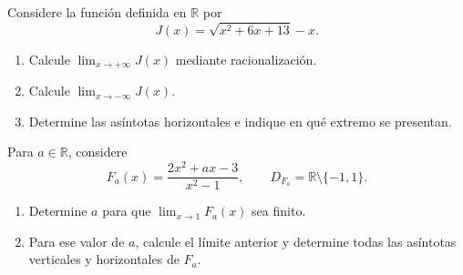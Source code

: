 \documentclass[10pt,a5paper]{article}
\newif\ifmostrarSoluciones
\newenvironment{solucionejercicio}[1]{%
  \par\medskip\noindent\textbf{Solución del ejercicio #1.}%
  \enspace\ignorespaces
}{%
  \par\medskip
}
\begin{document}
\begin{ejerciciopractica}
  Considere la función definida en $\mathbb{R}$ por
  \[
    J(x)=\sqrt{x^2+6x+13}-x.
  \]
  \begin{enumerate}
    \item Calcule $\lim_{x\to+\infty}J(x)$ mediante racionalización.
    \item Calcule $\lim_{x\to-\infty}J(x)$.
    \item Determine las asíntotas horizontales e indique en qué extremo se presentan.
  \end{enumerate}
\end{ejerciciopractica}

\ifmostrarSoluciones
\begin{solucionejercicio}{2}
  El radicando es $(x+3)^2+4>0$, así que la función está definida para todo número real.

  Cuando $x\to+\infty$, aparece una diferencia de términos que crecen sin cota. Para $x>0$, multiplicamos por el conjugado y obtenemos
  \begin{align*}
    J(x)&=\frac{6x+13}{\sqrt{x^2+6x+13}+x}\\
        &=\frac{6+13/x}{\sqrt{1+6/x+13/x^2}+1}.
  \end{align*}
  En el último paso usamos $\sqrt{x^2}=x$, válido porque $x>0$. Por tanto,
  \[
    \lim_{x\to+\infty}J(x)=\frac{6}{1+1}=3.
  \]

  Para $x<0$, la raíz es no negativa y $-x>0$, de modo que $J(x)\geq-x$. Como $-x\to+\infty$ cuando $x\to-\infty$, la comparación implica
  \[
    \lim_{x\to-\infty}J(x)=+\infty.
  \]
  La única asíntota horizontal es $y=3$, hacia $+\infty$. No hay asíntota horizontal hacia $-\infty$.
\end{solucionejercicio}
\fi

\begin{ejerciciopractica}
  Para $a\in\mathbb{R}$, considere
  \[
    F_a(x)=\frac{2x^2+ax-3}{x^2-1},
    \qquad D_{F_a}=\mathbb{R}\setminus\{-1,1\}.
  \]
  \begin{enumerate}
    \item Determine $a$ para que $\lim_{x\to1}F_a(x)$ sea finito.
    \item Para ese valor de $a$, calcule el límite anterior y determine todas las asíntotas verticales y horizontales de $F_a$.
  \end{enumerate}
\end{ejerciciopractica}
\end{document}
